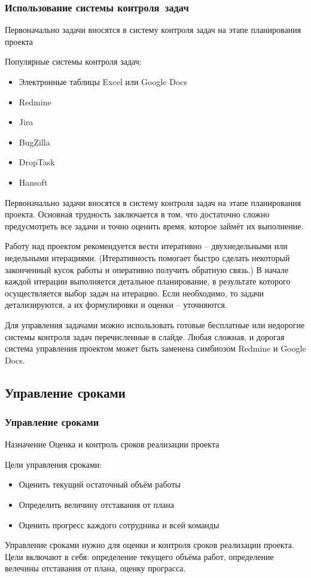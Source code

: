 \documentclass{../industrial-development}
\begin{document}
\begin{frame} \frametitle{Использование системы контроля~задач}
	\begin{block}{}
		Первоначально задачи вносятся в систему контроля задач на этапе планирования проекта
	\end{block}
	Популярные системы контроля задач:
	\begin{itemize}
		\item Электронные таблицы Excel или Google Docs
		\item Redmine
		\item Jira
		\item BugZilla
		\item DropTask
		\item Hansoft
	\end{itemize}
\end{frame}
\lecturenotes
Первоначально задачи вносятся в систему контроля задач на этапе планирования проекта. Основная трудность заключается в том, что достаточно сложно предусмотреть все задачи и точно оценить время, которое займёт их выполнение.

Работу над проектом рекомендуется вести итеративно – двухнедельными или недельными итерациями. (Итеративность помогает быстро сделать некоторый законченный кусок работы и оперативно получить обратную связь.) В начале каждой итерации выполняется детальное планирование, в результате которого осуществляется выбор задач на итерацию. Если необходимо, то задачи детализируются, а их формулировки и оценки – уточняются.

Для управления задачами можно использовать готовые бесплатные или недорогие системы контроля задач перечисленные в слайде.
Любая сложная, и дорогая система управления проектом может быть заменена симбиозом Redmine и Google Docs.

\subsection{Управление сроками}

\begin{frame} \frametitle{Управление сроками}
	\begin{block}{Назначение}
		Оценка и контроль сроков реализации проекта
	\end{block}
	Цели управления сроками:
	\begin{itemize}
		\item Оценить текущий остаточный объём работы
		\item Определить величину отставания от плана
		\item Оценить прогресс каждого сотрудника и всей команды
	\end{itemize}
\end{frame}
\lecturenotes
Управление сроками нужно для оценки и контроля сроков реализации проекта. Цели включают в себя: определение текущего объёма работ, определение велечины отставания от плана, оценку програсса.
\end{document}
